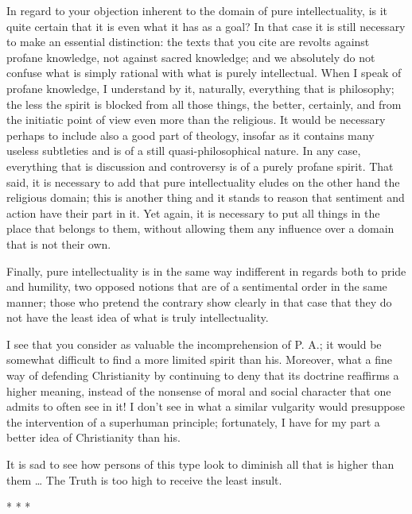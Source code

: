 In regard to your objection inherent to the domain of pure intellectuality, is it quite certain that it is even what it has as a goal? In that case it is still necessary to make an essential distinction: the texts that you cite are revolts against profane knowledge, not against sacred knowledge; and we absolutely do not confuse what is simply rational with what is purely intellectual. When I speak of profane knowledge, I understand by it, naturally, everything that is philosophy; the less the spirit is blocked from all those things, the better, certainly, and from the initiatic point of view even more than the religious. It would be necessary perhaps to include also a good part of theology, insofar as it contains many useless subtleties and is of a still quasi-philosophical nature. In any case, everything that is discussion and controversy is of a purely profane spirit. That said, it is necessary to add that pure intellectuality eludes on the other hand the religious domain; this is another thing and it stands to reason that sentiment and action have their part in it. Yet again, it is necessary to put all things in the place that belongs to them, without allowing them any influence over a domain that is not their own.

Finally, pure intellectuality is in the same way indifferent in regards both to pride and humility, two opposed notions that are of a sentimental order in the same manner; those who pretend the contrary show clearly in that case that they do not have the least idea of what is truly intellectuality.

I see that you consider as valuable the incomprehension of P. A.; it would be somewhat difficult to find a more limited spirit than his. Moreover, what a fine way of defending Christianity by continuing to deny that its doctrine reaffirms a higher meaning, instead of the nonsense of moral and social character that one admits to often see in it! I don't see in what a similar vulgarity would presuppose the intervention of a superhuman principle; fortunately, I have for my part a better idea of Christianity than his.

It is sad to see how persons of this type look to diminish all that is higher than them … The Truth is too high to receive the least insult.




\begin{center}* * *\end{center}

